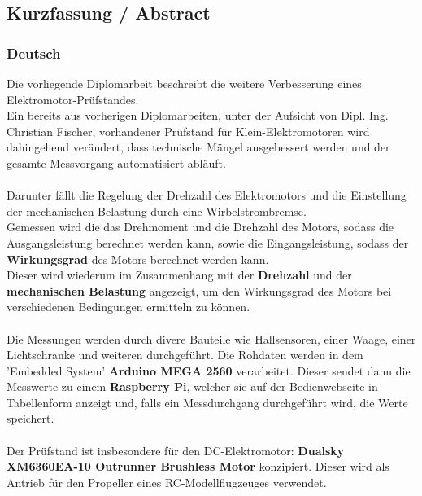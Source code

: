 \documentclass[12pt,a4paper]{article}
\begin{document}
\subsection*{Kurzfassung / Abstract}
\subsubsection*{Deutsch}
  Die vorliegende Diplomarbeit beschreibt die weitere Verbesserung eines Elektromotor-Prüfstandes. \\
  Ein bereits aus vorherigen Diplomarbeiten, unter der Aufsicht von Dipl. Ing. Christian Fischer,
  vorhandener Prüfstand für Klein-Elektromotoren wird dahingehend verändert, dass technische Mängel 
  ausgebessert werden und der gesamte Messvorgang automatisiert abläuft. \\\\
  Darunter fällt die Regelung der Drehzahl des Elektromotors und die Einstellung der mechanischen Belastung 
  durch eine Wirbelstrombremse. \\
%
  Gemessen wird die das Drehmoment und die Drehzahl des Motors, sodass die Ausgangsleistung berechnet werden kann, 
  sowie die Eingangsleistung, sodass der {\bf Wirkungsgrad} des Motors berechnet werden kann. \\
  Dieser wird wiederum im Zusammenhang mit der {\bf Drehzahl} und der {\bf mechanischen Belastung} angezeigt, um den 
  Wirkungsgrad des Motors bei verschiedenen Bedingungen ermitteln zu können. \\\\
%
  Die Messungen werden durch divere Bauteile wie Hallsensoren, einer Waage, einer Lichtschranke und weiteren durchgeführt. 
  Die Rohdaten werden in dem 'Embedded System' {\bf Arduino MEGA 2560} verarbeitet. 
  Dieser sendet dann die Messwerte zu einem {\bf Raspberry Pi}, welcher sie auf der Bedienwebseite 
  in Tabellenform anzeigt und, falls ein Messdurchgang durchgeführt wird, die Werte speichert. \\\\
%
  Der Prüfstand ist insbesondere für den DC-Elektromotor: {\bf Dualsky XM6360EA-10  Outrunner Brushless Motor} konzipiert. 
  Dieser wird als Antrieb für den Propeller eines RC-Modellflugzeuges verwendet. 
%
%
\newpage
\end{document}
